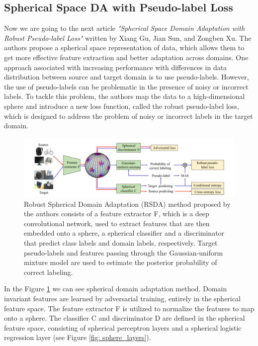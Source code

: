 \subsection{Spherical Space DA with Pseudo-label Loss}

Now we are going to the next article \textit{"Spherical Space Domain Adaptation with Robust Pseudo-label Loss"} written by  Xiang Gu, Jian Sun, and Zongben Xu. \cite{gu2020spherical} The authors propose a spherical space representation of data, which allows them to get more effective feature extraction and better adaptation across domains. One approach associated with increasing performance with differences in data distribution between source and target domain is to use pseudo-labels. However, the use of pseudo-labels can be problematic in the presence of noisy or incorrect labels. To tackle this problem, the authors map the data to a high-dimensional sphere and introduce a new loss function, called the robust pseudo-label loss, which is designed to address the problem of noisy or incorrect labels in the target domain. 

\begin{figure}[H]
    \centering
    \includegraphics[width=\textwidth]{Figures/From articles/RSDA_scheme.png}
    \caption{Robust Spherical Domain Adaptation (RSDA) method proposed by the authors consists of a feature extractor F, which is a deep convolutional network, used to extract features that are then embedded onto a sphere, a spherical classifier and a discriminator that predict class labels and domain labels, respectively. Target pseudo-labels and features passing through the Gaussian-uniform mixture model are used to estimate the posterior probability of correct labeling.}
    \label{fig: RSDA_scheme}
\end{figure}

In the Figure \ref{fig: RSDA_scheme} we can see spherical domain adaptation method. Domain invariant features are learned by adversarial training, entirely in the spherical feature space.  The feature extractor F is utilized to normalize the features to map onto a sphere. The classifier C and discriminator D are defined in the spherical feature space, consisting of spherical perceptron layers and a spherical logistic regression layer (see Figure \ref{fig: sphere_layers}). 

